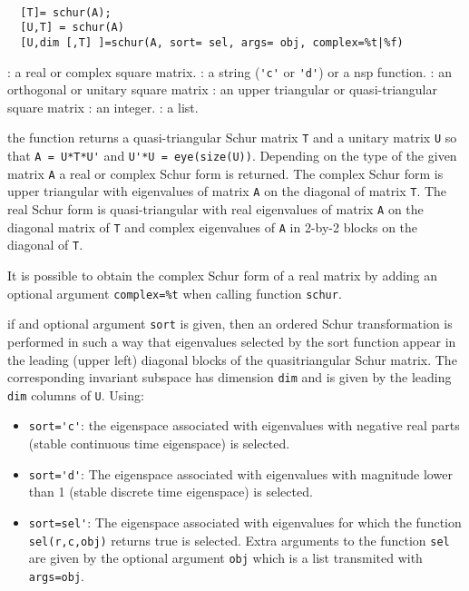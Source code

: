 \begin{mandesc}
   \\ %
\end{mandesc}
\begin{calling_sequence}
\begin{verbatim}
  [T]= schur(A);
  [U,T] = schur(A)   
  [U,dim [,T] ]=schur(A, sort= sel, args= obj, complex=%t|%f)
\end{verbatim}
\end{calling_sequence}
\begin{parameters}
  \begin{varlist}
    : a real or complex square matrix.
    : a string (\verb!'c'! or \verb!'d'!) or a nsp function.
    : an orthogonal or unitary square matrix
    : an upper triangular or quasi-triangular square matrix
    : an integer.
    : a list.
  \end{varlist}
\end{parameters}
\begin{mandescription}
   the function returns a quasi-triangular Schur matrix \verb!T! and 
   a unitary matrix \verb!U! so that \verb!A = U*T*U'! and 
   \verb!U'*U = eye(size(U))!. Depending on the type of the 
   given matrix \verb!A! a real or complex Schur form is returned. 
   The complex Schur form is  upper triangular with eigenvalues
   of matrix \verb!A! on the diagonal of matrix \verb!T!. The real 
   Schur form is quasi-triangular with real eigenvalues of matrix \verb!A! 
   on the diagonal matrix of \verb!T! and complex eigenvalues of 
    \verb!A! in 2-by-2 blocks on the diagonal of \verb!T!.

    It is possible to obtain the complex Schur form of a real matrix 
    by adding an optional argument \verb!complex=%t! when calling function
    \verb!schur!.

    if and optional argument \verb!sort! is given, then an ordered 
    Schur transformation is performed in such a way that eigenvalues 
    selected by the sort function appear in the leading (upper left) 
    diagonal blocks of the quasitriangular Schur matrix. The corresponding 
    invariant subspace has dimension \verb!dim! and is given by the 
    leading \verb!dim! columns of \verb!U!. Using:
    \begin{itemize}
      \item \verb!sort='c'!: the eigenspace associated with
      eigenvalues with negative real parts (stable continuous time eigenspace) is selected.
      \item \verb!sort='d'!: The eigenspace associated with
      eigenvalues with magnitude lower than 1 (stable discrete time eigenspace) is selected.
      \item \verb!sort=sel'!: The eigenspace associated with
      eigenvalues for which the function \verb!sel(r,c,obj)! returns true 
      is selected. Extra arguments to the function \verb!sel! are given 
      by the optional argument \verb!obj! which is a list transmited with \verb!args=obj!.
    \end{itemize}
\end{mandescription}
